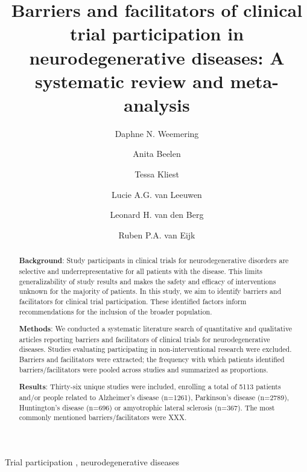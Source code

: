 \documentclass[preprint, 3p,
authoryear]{elsarticle} %
\begin{document}
\begin{frontmatter}

  \title{Barriers and facilitators of clinical trial participation in
neurodegenerative diseases: A systematic review and meta-analysis}
    \author[Neuro]{Daphne N. Weemering%
  }
  
    \author[Rehab, Excel]{Anita Beelen%
  }
  
    \author[Neuro]{Tessa Kliest%
  }
  
    \author[Neuro]{Lucie A.G. van Leeuwen%
  }
  
    \author[Neuro]{Leonard H. van den Berg%
  }
  
    \author[Neuro, Julius]{Ruben P.A. van Eijk%
  }
  
  \begin{abstract}
  \textbf{Background}: Study participants in clinical trials for
  neurodegenerative disorders are selective and underrepresentative for
  all patients with the disease. This limits generalizability of study
  results and makes the safety and efficacy of interventions unknown for
  the majority of patients. In this study, we aim to identify barriers
  and facilitators for clinical trial participation. These identified
  factors inform recommendations for the inclusion of the broader
  population.

  \textbf{Methods}: We conducted a systematic literature search of
  quantitative and qualitative articles reporting barriers and
  facilitators of clinical trials for neurodegenerative diseases.
  Studies evaluating participating in non-interventional research were
  excluded. Barriers and facilitators were extracted; the frequency with
  which patients identified barriers/facilitators were pooled across
  studies and summarized as proportions.

  \textbf{Results}: Thirty-six unique studies were included, enrolling a
  total of 5113 patients and/or people related to Alzheimer's disease
  (n=1261), Parkinson's disease (n=2789), Huntington's disease (n=696)
  or amyotrophic lateral sclerosis (n=367). The most commonly mentioned
  barriers/facilitators were XXX.
  \end{abstract}
    \begin{keyword}
    Trial participation \sep 
    neurodegenerative diseases
  \end{keyword}
  
 \end{frontmatter}
\end{document}
